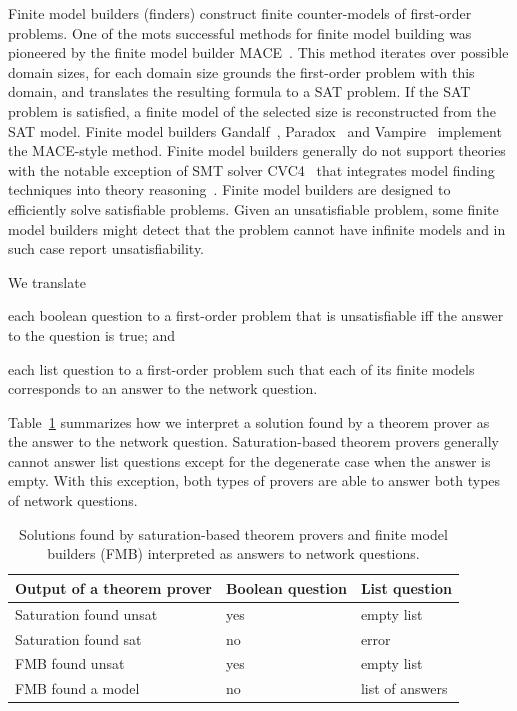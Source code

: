 Finite model builders (finders) construct finite counter-models of first-order problems. One of the mots successful methods for finite model building was pioneered by the finite model builder MACE~\cite{mccune1994davis}. This method iterates over possible domain sizes, for each domain size grounds the first-order problem with this domain, and translates the resulting formula to a SAT problem. If the SAT problem is satisfied, a finite model of the selected size is reconstructed from the SAT model. Finite model builders Gandalf~\cite{Gandalf}, Paradox~\cite{claessen2003new} and Vampire~\cite{VampireFMB} implement the MACE-style method. Finite model builders generally do not support theories with the notable exception of SMT solver CVC4~\cite{CVC4} that integrates model finding techniques into theory reasoning~\cite{CVC4FMB}. Finite model builders are designed to efficiently solve satisfiable problems. Given an unsatisfiable problem, some finite model builders might detect that the problem cannot have infinite models and in such case report unsatisfiability.

We translate
\begin{enumerate*}[label=(\roman*)]
  \item each boolean question to a first-order problem that is unsatisfiable iff the answer to the question is true; and
  \item each list question to a first-order problem such that each of its finite models corresponds to an answer to the network question.
\end{enumerate*}
Table~\ref{fig:fol-answering-questions} summarizes how we interpret a solution found by a theorem prover as the answer to the network question. Saturation-based theorem provers generally cannot answer list questions except for the degenerate case when the answer is empty. With this exception, both types of provers are able to answer both types of network questions. 

\begin{table}
  \center
  \begin{tabular}{lll}
    \hline
    Output of a theorem prover & Boolean question & List question \\
    \hline
    Saturation found unsat & yes & empty list \\
    Saturation found sat   & no  & error \\
    FMB found unsat        & yes & empty list \\
    FMB found a model      & no  & list of answers \\
  \end{tabular}
  \caption{Solutions found by saturation-based theorem provers and finite model builders (FMB) interpreted as answers to network questions.}
  \label{fig:fol-answering-questions}
\end{table}

